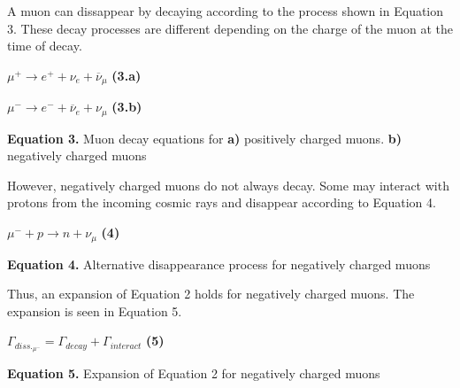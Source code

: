 \documentclass{article}
\begin{document}
A muon can dissappear by decaying according to the process shown in Equation 3. These decay processes are different depending on the charge of the muon at the time of decay.

\begin{center}

    $\mu^{+} \rightarrow e^{+} + \nu_{e} + \overline{\nu}_{\mu}$ \hspace{10mm} \textbf{(3.a)}

    \vspace{1 mm}

    $\mu^{-} \rightarrow e^{-} + \overline{\nu}_{e} + \nu_{\mu}$ \hspace{10mm} \textbf{(3.b)}

    \vspace{5mm}

    \textbf{Equation 3.} Muon decay equations for \textbf{a)} positively charged muons. \textbf{b)} negatively charged muons

\end{center}

However, negatively charged muons do not always decay. Some may interact with protons from the incoming cosmic rays and disappear according to Equation 4.

\begin{center}

    $\mu^{-} + \textit{p} \rightarrow \textit{n} +  \nu_{\mu}$ \hspace{10mm} \textbf{(4)}

    \vspace{5mm}

    \textbf{Equation 4.} Alternative disappearance process for negatively charged muons

\end{center}

Thus, an expansion of Equation 2 holds for negatively charged muons. The expansion is seen in Equation 5.
\begin{center}

    $\Gamma_{diss._{\mu^{-}}} = \Gamma_{decay} + \Gamma_{interact}$ \hspace{10mm} \textbf{(5)}

    \vspace{5mm}

    \textbf{Equation 5.} Expansion of Equation 2 for negatively charged muons

\end{center}
\end{document}
